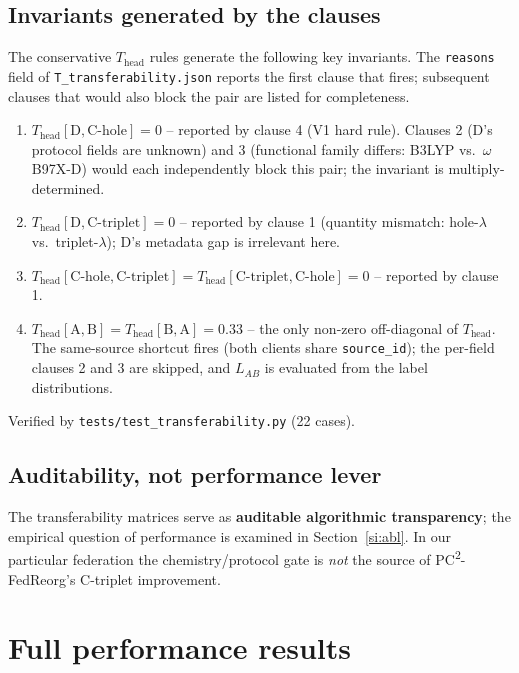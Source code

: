 \documentclass[11pt,a4paper]{article}
\newcommand{\PC}{PC\textsuperscript{2}-FedReorg}
\begin{document}
\subsection{Invariants generated by the clauses}
The conservative $T_{\mathrm{head}}$ rules generate the following key invariants. The \texttt{reasons} field of \texttt{T\_transferability.json} reports the first clause that fires; subsequent clauses that would also block the pair are listed for completeness.
\begin{enumerate}
  \item $T_{\mathrm{head}}[\mathrm{D}, \mathrm{C\text{-}hole}] = 0$ -- reported by clause 4 (V1 hard rule). Clauses 2 (D's protocol fields are unknown) and 3 (functional family differs: B3LYP vs.\ $\omega$B97X-D) would each independently block this pair; the invariant is multiply-determined.
  \item $T_{\mathrm{head}}[\mathrm{D}, \mathrm{C\text{-}triplet}] = 0$ -- reported by clause 1 (quantity mismatch: hole-$\lambda$ vs.\ triplet-$\lambda$); D's metadata gap is irrelevant here.
  \item $T_{\mathrm{head}}[\mathrm{C\text{-}hole}, \mathrm{C\text{-}triplet}] = T_{\mathrm{head}}[\mathrm{C\text{-}triplet}, \mathrm{C\text{-}hole}] = 0$ -- reported by clause 1.
  \item $T_{\mathrm{head}}[\mathrm{A}, \mathrm{B}] = T_{\mathrm{head}}[\mathrm{B}, \mathrm{A}] = 0.33$ -- the only non-zero off-diagonal of $T_{\mathrm{head}}$. The same-source shortcut fires (both clients share \texttt{source\_id}); the per-field clauses 2 and 3 are skipped, and $L_{AB}$ is evaluated from the label distributions.
\end{enumerate}
Verified by \texttt{tests/test\_transferability.py} (22 cases).

\subsection{Auditability, not performance lever}
The transferability matrices serve as \textbf{auditable algorithmic transparency}; the empirical question of performance is examined in Section~\ref{si:abl}. In our particular federation the chemistry/protocol gate is \emph{not} the source of \PC{}'s C-triplet improvement.

\section{Full performance results}\label{si:perf}
\end{document}
